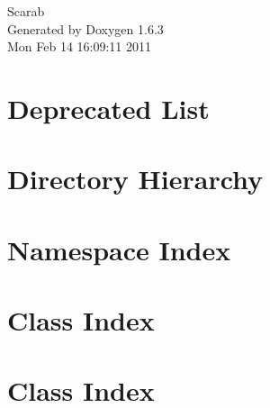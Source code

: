 \documentclass[a4paper]{book}
\begin{document}
\hypersetup{pageanchor=false}
\begin{titlepage}
\vspace*{7cm}
\begin{center}
{\Large Scarab }\\
\vspace*{1cm}
{\large Generated by Doxygen 1.6.3}\\
\vspace*{0.5cm}
{\small Mon Feb 14 16:09:11 2011}\\
\end{center}
\end{titlepage}
\clearemptydoublepage
{}
\tableofcontents
\clearemptydoublepage
{}
\hypersetup{pageanchor=true}
\chapter{Deprecated List}
\label{deprecated}
\hypertarget{deprecated}{}

\chapter{Directory Hierarchy}

\chapter{Namespace Index}

\chapter{Class Index}

\chapter{Class Index}

\end{document}
